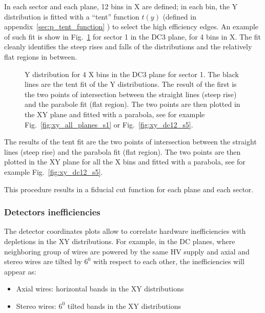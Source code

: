 In each sector and each plane, 12 bins in X are defined; in each bin, the Y distribution
is fitted with a ``tent'' function $t(y)$ (defined in appendix~\ref{sec:p_tent_function} ) to select the high efficiency edges.
An example of such fit is show in Fig.~\ref{fig:y_slices_s1} for sector 1 in the DC3 plane, for 4 bins in X.
The fit cleanly identifies the steep rises and falls of the distributions and the relatively flat regions in between.


\begin{figure}[h]
    \centering
    \caption{Y distribution for 4 X bins in the DC3 plane for sector 1. The black lines are the tent fit of the Y distributions.
    The result of the first is the two points of intersection between the straight lines (steep rise) and the parabole fit (flat region).
    The two points are then plotted in the XY plane and fitted with a parabola, see for example Fig.~\ref{fig:xy_all_planes_s1}
    or Fig.~\ref{fig:xy_dc12_s5}.}
    \label{fig:y_slices_s1}
\end{figure}

The results of the tent fit are the two points of intersection between the straight lines (steep rise) and the parabola fit (flat region).
The two points are then plotted in the XY plane for all the X bins and fitted with a parabola, see for example Fig.~\ref{fig:xy_dc12_s5}.

This procedure results in a fiducial cut function for each plane and each sector.


\newpage

\subsubsection{Detectors inefficiencies}
The detector coordinates plots allow to correlate hardware inefficiencies with depletions in the XY distributions.
For example, in the DC planes, where neighboring group of wires are powered by the same HV supply and
axial and stereo wires are tilted by $6^0$ with respect to each other, the inefficiencies
will appear as:

\begin{itemize}
    \item Axial wires: horizontal bands in the XY distributions
    \item Stereo wires: $6^0$ tilted bands in the XY distributions
\end{itemize}

